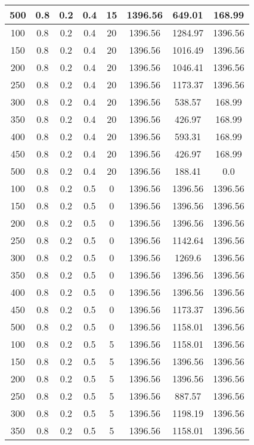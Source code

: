 \documentclass[a4paper, 12pt]{extreport}
\begin{document}
\begin{itemize}
\begin{longtable}{|c|c|c|c|c|c|c|c|}
			500 & 0.8 & 0.2 & 0.4 & 15 & 1396.56 & 649.01 & 168.99 \\\hline
			100 & 0.8 & 0.2 & 0.4 & 20 & 1396.56 & 1284.97 & 1396.56 \\\hline
			150 & 0.8 & 0.2 & 0.4 & 20 & 1396.56 & 1016.49 & 1396.56 \\\hline
			200 & 0.8 & 0.2 & 0.4 & 20 & 1396.56 & 1046.41 & 1396.56 \\\hline
			250 & 0.8 & 0.2 & 0.4 & 20 & 1396.56 & 1173.37 & 1396.56 \\\hline
			300 & 0.8 & 0.2 & 0.4 & 20 & 1396.56 & 538.57 & 168.99 \\\hline
			350 & 0.8 & 0.2 & 0.4 & 20 & 1396.56 & 426.97 & 168.99 \\\hline
			400 & 0.8 & 0.2 & 0.4 & 20 & 1396.56 & 593.31 & 168.99 \\\hline
			450 & 0.8 & 0.2 & 0.4 & 20 & 1396.56 & 426.97 & 168.99 \\\hline
			500 & 0.8 & 0.2 & 0.4 & 20 & 1396.56 & 188.41 & 0.0 \\\hline
			100 & 0.8 & 0.2 & 0.5 & 0 & 1396.56 & 1396.56 & 1396.56 \\\hline
			150 & 0.8 & 0.2 & 0.5 & 0 & 1396.56 & 1396.56 & 1396.56 \\\hline
			200 & 0.8 & 0.2 & 0.5 & 0 & 1396.56 & 1396.56 & 1396.56 \\\hline
			250 & 0.8 & 0.2 & 0.5 & 0 & 1396.56 & 1142.64 & 1396.56 \\\hline
			300 & 0.8 & 0.2 & 0.5 & 0 & 1396.56 & 1269.6 & 1396.56 \\\hline
			350 & 0.8 & 0.2 & 0.5 & 0 & 1396.56 & 1396.56 & 1396.56 \\\hline
			400 & 0.8 & 0.2 & 0.5 & 0 & 1396.56 & 1396.56 & 1396.56 \\\hline
			450 & 0.8 & 0.2 & 0.5 & 0 & 1396.56 & 1173.37 & 1396.56 \\\hline
			500 & 0.8 & 0.2 & 0.5 & 0 & 1396.56 & 1158.01 & 1396.56 \\\hline
			100 & 0.8 & 0.2 & 0.5 & 5 & 1396.56 & 1158.01 & 1396.56 \\\hline
			150 & 0.8 & 0.2 & 0.5 & 5 & 1396.56 & 1396.56 & 1396.56 \\\hline
			200 & 0.8 & 0.2 & 0.5 & 5 & 1396.56 & 1396.56 & 1396.56 \\\hline
			250 & 0.8 & 0.2 & 0.5 & 5 & 1396.56 & 887.57 & 1396.56 \\\hline
			300 & 0.8 & 0.2 & 0.5 & 5 & 1396.56 & 1198.19 & 1396.56 \\\hline
			350 & 0.8 & 0.2 & 0.5 & 5 & 1396.56 & 1158.01 & 1396.56 \\\hline

\end{longtable}
\end{itemize}
\end{document}
